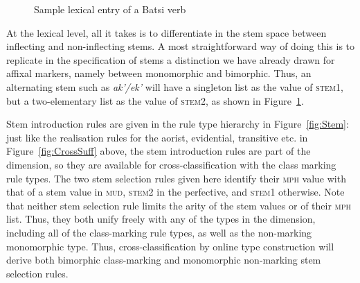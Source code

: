 \documentclass[output=paper]{langsci/langscibook}
\begin{document}
\begin{figure}
  \caption{Sample lexical entry of a Batsi verb\label{fig:Lexeme}}
\end{figure}

At the lexical level, all it takes is to differentiate in the stem
space between inflecting and non-inflecting stems. A most
straightforward way of doing this is to replicate in the specification
of stems a distinction we have already drawn for affixal markers,
namely between monomorphic and bimorphic. Thus, an alternating stem
such as \textit{ak'/ek'} will have a singleton list as the value of
\textsc{stem1}, but a two-elementary list as the value of
\textsc{stem2}, as shown in Figure~\ref{fig:Lexeme}.  

Stem introduction rules are given in the rule type hierarchy in
Figure~\ref{fig:Stem}: just like the realisation rules for the aorist,
evidential, transitive etc. in Figure~\ref{fig:CrossSuff} above, the stem
introduction rules are part of the  dimension, so
they are available for cross-classification with the class marking rule
types. The two stem selection rules given here identify their
\textsc{mph} value with that of a stem value in \textsc{mud},
\textsc{stem2} in the perfective, and \textsc{stem1} otherwise. Note
that neither stem selection rule limits the arity of the stem
values or of their \textsc{mph} list. Thus, they  both unify freely
with any of the types in the  dimension, including all
of the class-marking rule types, as well as the
non-marking monomorphic type. Thus, cross-classification by online type
construction will derive both bimorphic class-marking  and monomorphic
non-marking stem selection rules.    
  
\end{document}

